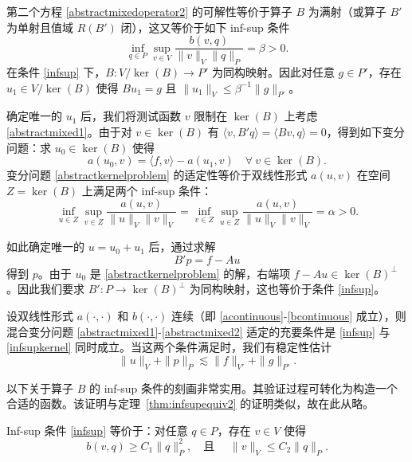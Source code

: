 第二个方程 \eqref{abstractmixedoperator2} 的可解性等价于算子 $B$ 为满射（或算子 $B'$ 为单射且值域 $R(B')$ 闭），这又等价于如下 inf-sup 条件
\begin{equation}\label{infsup}
\inf_{q\in P}\sup_{v\in V}\frac{b(v, q)}{\|v\|_V\|q\|_P}=\beta>0.
\end{equation}
在条件 \eqref{infsup} 下，$B : V/\ker(B)\to P'$ 为同构映射。因此对任意 $g\in P'$，存在 $u_1\in V/\ker(B)$ 使得 $Bu_1 = g$ 且 $\|u_1\|_V\leq \beta^{-1}\|g\|_{P'}$。

确定唯一的 $u_1$ 后，我们将测试函数 $v$ 限制在 $\ker(B)$ 上考虑 \eqref{abstractmixed1}。由于对 $v\in \ker(B)$ 有 $\langle v, B'q\rangle = \langle Bv, q\rangle = 0$，得到如下变分问题：求 $u_0\in \ker(B)$ 使得
\begin{equation}\label{abstractkernelproblem}
a(u_0, v) = \langle f, v\rangle- a(u_1, v)\quad \forall~v \in \ker(B).
\end{equation}
变分问题 \eqref{abstractkernelproblem} 的适定性等价于双线性形式 $a(u, v)$ 在空间 $Z = \ker(B)$ 上满足两个 inf-sup 条件：
\begin{equation}\label{infsupkernel}
\inf_{u\in Z}\sup_{v\in Z}\frac{a(u, v)}{\|u\|_V\|v\|_V}=\inf_{v\in Z}\sup_{u\in Z}\frac{a(u, v)}{\|u\|_V\|v\|_V}=\alpha>0.
\end{equation}

如此确定唯一的 $u = u_0 + u_1$ 后，通过求解
\[
B'p = f - Au
\]
得到 $p$。由于 $u_0$ 是 \eqref{abstractkernelproblem} 的解，右端项 $f - Au \in \ker(B)^{\perp}$。因此我们要求 $B': P\to \ker(B)^{\perp}$ 为同构映射，这也等价于条件 \eqref{infsup}。

\begin{theorem}
设双线性形式 $a(\cdot, \cdot)$ 和 $b(\cdot, \cdot)$ 连续（即 \eqref{acontinuous}-\eqref{bcontinuous} 成立），则混合变分问题 \eqref{abstractmixed1}-\eqref{abstractmixed2} 适定的充要条件是 \eqref{infsup} 与 \eqref{infsupkernel} 同时成立。当这两个条件满足时，我们有稳定性估计
\[
\|u\|_V+\|p\|_P\lesssim \|f\|_{V'}+\|g\|_{P'}.
\]
\end{theorem}

以下关于算子 $B$ 的 inf-sup 条件的刻画非常实用。其验证过程可转化为构造一个合适的函数。该证明与定理~\ref{thm:infsupequiv2} 的证明类似，故在此从略。
\begin{theorem}
Inf-sup 条件 \eqref{infsup} 等价于：对任意 $q\in P$，存在 $v\in V$ 使得
\begin{equation*}%
b(v, q)\geq C_1\|q\|_P^2,\quad\textrm{且 } \quad\|v\|_V\leq C_2\|q\|_P.
\end{equation*}
\end{theorem}

